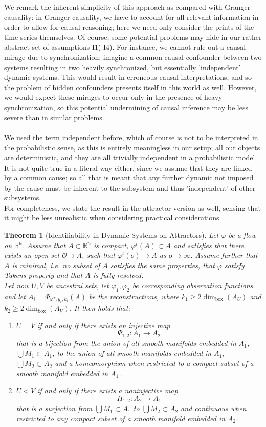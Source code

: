 \documentclass[11pt, a4paper]{memoir}
\theoremstyle{break}
\newtheorem{thm}{Theorem}
\theoremstyle{break}
\theoremstyle{nonumberplain}
\newcommand{\mR}{\mathbb{R}}
\begin{document}
We remark the inherent simplicity of this approach as compared with Granger causality: in Granger causality, we have to account for all relevant information in order to allow for causal reasoning; here we need only consider the prints of the time series themselves. Of course, some potential problems may hide in our rather abstract set of assumptions I1)-I4). For instance, we cannot rule out a causal mirage due to synchronization: imagine a common causal confounder between two systems resulting in two heavily synchronized, but essentially 'independent' dynamic systems. This would result in erroneous causal interpretations, and so the problem of hidden confounders presents itself in this world as well. However, we would expect these mirages to occur only in the presence of heavy synchronization, so this potential undermining of causal inference may be less severe than in similar problems.\\\\ 
We used the term independent before, which of course is not to be interpreted in the probabilistic sense, as this is entirely meaningless in our setup; all our objects are deterministic, and they are all trivially independent in a probabilistic model. It is not quite true in a literal way either, since we assume that they are linked by a common cause; so all  that is meant that any further dynamic not imposed by the cause must be inherent to the subsystem and thus 'independent' of other subsystems.\\[5pt]
For completeness, we state the result in the attractor version as well, sensing that it might be less unrealistic when considering practical considerations.
\begin{thm}[Identifiability in Dynamic Systems on Attractors]
Let $\varphi$ be a flow on $\mR^n$. Assume that $A\subset \mR^n$ is compact, $\varphi^t(A)\subset A$ and satisfies that there exists an open set $\mathcal{O}\supset A$, such that $\varphi^{t}(o)\to A$ as $o\to\infty$. Assume further that $A$ is minimal, i.e. no subset of $A$ satisfies the same properties, that $\varphi$ satisfy Takens property and that $A$ is fully resolved.\\[5pt]
Let now $U,V$ be ancestral sets, let $\varphi_1,\varphi_2$ be corresponding observation functions and let $A_i=\Phi_{\varphi^T,y_i,k_i}(A)$ be the reconstructions, where $k_1\geqslant 2\dim_\text{box}(A_U)$ and $k_2\geqslant 2\dim_\text{box}(A_V)$. It then holds that:
\begin{enumerate}[label=\roman*.]
	\item $U=V$ if and only if there exists an injective map
	$$\Psi_{1,2}:A_1\to A_2$$
	that is a bijection from the union of all smooth manifolds embedded in $A_1$, $\bigcup M_1\subset A_1$, to the union of all smooth manifolds embedded in $A_1$, $\bigcup M_2\subset A_2$ and a homeomorphism when restricted to a compact subset of a smooth manifold embedded in $A_1$.
	\item $U<V$ if and only if there exists a noninjective map
	$$\Pi_{1,2}:A_2\to A_1$$ 
	that is a surjection from $\bigcup M_1\subset A_1$ to $\bigcup M_2\subset A_2$ and continuous when restricted to any compact subset of a smooth manifold embedded in $A_2$.
\end{enumerate}
\end{thm}
\end{document}
